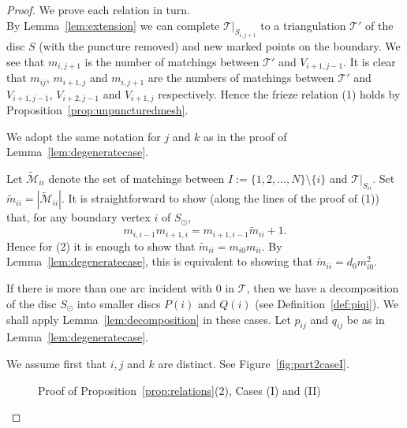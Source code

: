\documentclass[a4paper]{amsart}
\begin{document}
\begin{proof}
We prove each relation in turn. \\
By Lemma~\ref{lem:extension} we can complete ${\mathcal T}|_{S_{i,j+1}}$ to a triangulation
${\mathcal T}'$ of the disc $S$ (with the puncture removed) and new marked points
on the boundary.
We see that $m_{i,j+1}$ is the number of matchings between ${\mathcal T}'$
and $V_{i+1,j-1}$. It is clear that
$m_{ij}$, $m_{i+1,j}$ and $m_{i,j+1}$ are the numbers of matchings between
${\mathcal T}'$ and $V_{i+1,j-1}$, $V_{i+2,j-1}$ and $V_{i+1,j}$
respectively. Hence the frieze relation (1) holds by
Proposition~\ref{prop:unpuncturedmesh}.

We adopt the same notation for $j$ and $k$ as in the proof of
Lemma~\ref{lem:degeneratecase}.

Let $\widetilde{\mathcal M}_{ii}$ denote the set of matchings between
$I:=\{1,2,\ldots ,N\}\setminus \{i\}$ and ${\mathcal T}|_{S_{ii}}$.
Set $\widetilde{m}_{ii}=|\widetilde{\mathcal M}_{ii}|$.
It is straightforward to show (along the lines of the proof of (1))
that, for any boundary vertex $i$ of $S_{\odot}$,
$$m_{i,i-1}m_{i+1,i}=m_{i+1,i-1}\widetilde{m}_{ii}+1.$$
Hence for (2) it is enough to show that $\widetilde{m}_{ii}=m_{i0}m_{ii}$.
By Lemma~\ref{lem:degeneratecase}, this is equivalent to showing that
$\widetilde{m}_{ii}=d_0m_{i0}^2$.
 
If there is more than one arc incident with $0$ in ${\mathcal T}$, then we have a
decomposition of the disc $S_{\odot}$ into smaller discs $P(i)$ and $Q(i)$
(see Definition~\ref{def:piqi}).
We shall apply Lemma~\ref{lem:decomposition} in these cases. Let $p_{ij}$
and $q_{ij}$ be as in Lemma~\ref{lem:degeneratecase}. 

We assume first that $i,j$ and $k$ are distinct.
See Figure~\ref{fig:part2caseI}.

\begin{figure}\label{fig:part2caseIandII}
\begin{center}
\hskip 2cm
\end{center}
\caption{Proof of Proposition~\ref{prop:relations}(2), Cases (I) and (II)}
\end{figure}


\end{proof}
\end{document}
